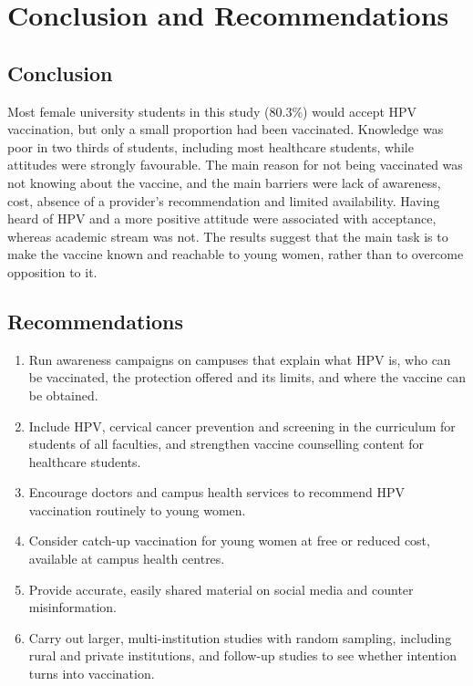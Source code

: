 \chapter{Conclusion and Recommendations}

\section{Conclusion}
Most female university students in this study (80.3\%) would accept HPV vaccination, but only a small proportion had been vaccinated. Knowledge was poor in two thirds of students, including most healthcare students, while attitudes were strongly favourable. The main reason for not being vaccinated was not knowing about the vaccine, and the main barriers were lack of awareness, cost, absence of a provider's recommendation and limited availability. Having heard of HPV and a more positive attitude were associated with acceptance, whereas academic stream was not. The results suggest that the main task is to make the vaccine known and reachable to young women, rather than to overcome opposition to it.

\section{Recommendations}
\begin{enumerate}[leftmargin=*,itemsep=3pt]
\item Run awareness campaigns on campuses that explain what HPV is, who can be vaccinated, the protection offered and its limits, and where the vaccine can be obtained.
\item Include HPV, cervical cancer prevention and screening in the curriculum for students of all faculties, and strengthen vaccine counselling content for healthcare students.
\item Encourage doctors and campus health services to recommend HPV vaccination routinely to young women.
\item Consider catch-up vaccination for young women at free or reduced cost, available at campus health centres.
\item Provide accurate, easily shared material on social media and counter misinformation.
\item Carry out larger, multi-institution studies with random sampling, including rural and private institutions, and follow-up studies to see whether intention turns into vaccination.
\end{enumerate}
